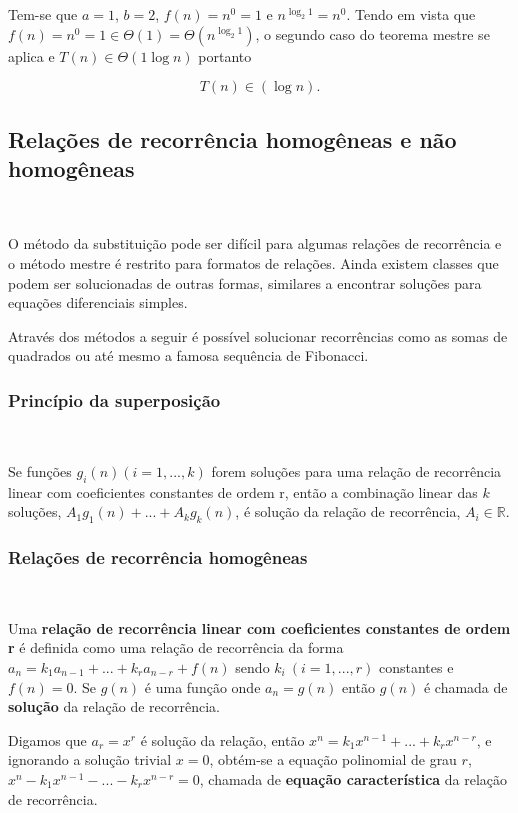 Tem-se que $a=1$, $b=2$, $f(n)=n^0=1$ e $n^{\log_2 1}=n^0$. Tendo em vista que $f(n)=n^0=1 \in \Theta(1)=\Theta(n^{\log_2 1})$, o segundo caso do teorema mestre se aplica e $T(n) \in \Theta(1 \log n)$ portanto

\[T(n) \in (\log n).\]



\subsection{Relações de recorrência homogêneas e não homogêneas}
\

O método da substituição pode ser difícil para algumas relações de recorrência e o método mestre é restrito para formatos de relações. Ainda existem classes que podem ser solucionadas de outras formas, similares a encontrar soluções para equações diferenciais simples.

Através dos métodos a seguir é possível solucionar recorrências como as somas de quadrados ou até mesmo a famosa sequência de Fibonacci.

\subsubsection{Princípio da superposição}
\

Se funções $g_i(n) (i = 1, ..., k)$ forem soluções para uma relação de recorrência linear com coeficientes constantes de ordem r, então a combinação linear das $k$ soluções, $A_1g_1(n) + ... + A_kg_k(n)$, é solução da relação de recorrência, $A_i \in \mathbb{R}$.

\subsubsection{Relações de recorrência homogêneas}
\

Uma \textbf{relação de recorrência linear com coeficientes constantes de ordem r} é definida como uma relação de recorrência da forma $a_n = k_1a_{n-1}+...+k_ra_{n-r} + f(n)$ sendo $k_i \ (i = 1, ... , r)$ constantes e $f(n) = 0$. Se $g(n)$ é uma função onde $a_n=g(n)$ então $g(n)$ é chamada de \textbf{solução} da relação de recorrência.

Digamos que $a_r = x^r$ é solução da relação, então $x^n = k_1x^{n-1}+...+k_rx^{n-r}$, e ignorando a solução trivial $x=0$, obtém-se a equação polinomial de grau $r$, $x^n - k_1x^{n-1}-...-k_rx^{n-r} = 0$, chamada de \textbf{equação característica} da relação de recorrência.

